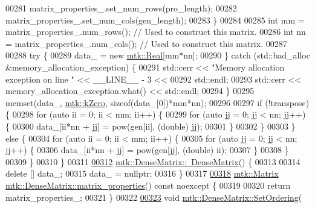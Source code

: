 \begin{DoxyCode}
00281     matrix\_properties\_.set\_num\_rows(pro\_length);
00282     matrix\_properties\_.set\_num\_cols(gen\_length);
00283   \}
00284 
00285   \textcolor{keywordtype}{int} mm = matrix\_properties\_.num\_rows(); \textcolor{comment}{// Used to construct this matrix.}
00286   \textcolor{keywordtype}{int} nn = matrix\_properties\_.num\_cols(); \textcolor{comment}{// Used to construct this matrix.}
00287 
00288   \textcolor{keywordflow}{try} \{
00289     data\_ = \textcolor{keyword}{new} \hyperlink{group__c01-roots_gac080bbbf5cbb5502c9f00405f894857d}{mtk::Real}[mm*nn];
00290   \} \textcolor{keywordflow}{catch} (std::bad\_alloc &memory\_allocation\_exception) \{
00291     std::cerr << \textcolor{stringliteral}{"Memory allocation exception on line "} << \_\_LINE\_\_ - 3 <<
00292       std::endl;
00293     std::cerr << memory\_allocation\_exception.what() << std::endl;
00294   \}
00295   memset(data\_, \hyperlink{group__c01-roots_ga59a451a5fae30d59649bcda274fea271}{mtk::kZero}, \textcolor{keyword}{sizeof}(data\_[0])*mm*nn);
00296 
00297   \textcolor{keywordflow}{if} (!transpose) \{
00298     \textcolor{keywordflow}{for} (\textcolor{keyword}{auto} ii = 0; ii < mm; ii++) \{
00299       \textcolor{keywordflow}{for} (\textcolor{keyword}{auto} jj = 0; jj < nn; jj++) \{
00300         data\_[ii*nn + jj] = pow(gen[ii], (\textcolor{keywordtype}{double}) jj);
00301       \}
00302     \}
00303   \} \textcolor{keywordflow}{else} \{
00304     \textcolor{keywordflow}{for} (\textcolor{keyword}{auto} ii = 0; ii < mm; ii++) \{
00305       \textcolor{keywordflow}{for} (\textcolor{keyword}{auto} jj = 0; jj < nn; jj++) \{
00306         data\_[ii*nn + jj] = pow(gen[jj], (\textcolor{keywordtype}{double}) ii);
00307       \}
00308     \}
00309   \}
00310 \}
00311 
\hypertarget{mtk__dense__matrix_8cc_source_l00312}{}\hyperlink{classmtk_1_1DenseMatrix_a8d4a0df33bd4e4edf5d2fe5539885b85}{00312} \hyperlink{classmtk_1_1DenseMatrix_a8d4a0df33bd4e4edf5d2fe5539885b85}{mtk::DenseMatrix::~DenseMatrix}() \{
00313 
00314   \textcolor{keyword}{delete} [] data\_;
00315   data\_ = \textcolor{keyword}{nullptr};
00316 \}
00317 
\hypertarget{mtk__dense__matrix_8cc_source_l00318}{}\hyperlink{classmtk_1_1DenseMatrix_a5aa83a0643f27a4652ea97630edf7143}{00318} \hyperlink{classmtk_1_1Matrix}{mtk::Matrix} \hyperlink{classmtk_1_1DenseMatrix_a5aa83a0643f27a4652ea97630edf7143}{mtk::DenseMatrix::matrix\_properties}() const 
      noexcept \{
00319 
00320   \textcolor{keywordflow}{return} matrix\_properties\_;
00321 \}
00322 
\hypertarget{mtk__dense__matrix_8cc_source_l00323}{}\hyperlink{classmtk_1_1DenseMatrix_a178e63f365cf8c547dc5020c60357f5e}{00323} \textcolor{keywordtype}{void} \hyperlink{classmtk_1_1DenseMatrix_a178e63f365cf8c547dc5020c60357f5e}{mtk::DenseMatrix::SetOrdering}(

\end{DoxyCode}
